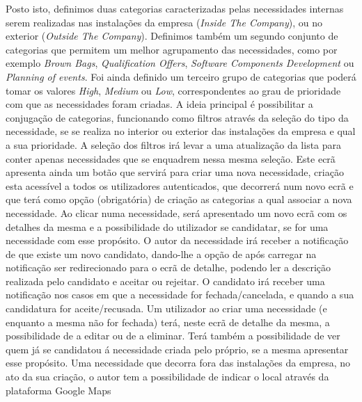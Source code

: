Posto isto, definimos duas categorias caracterizadas pelas necessidades internas serem realizadas nas instalações da empresa (\textit{Inside The Company}), 
ou no exterior (\textit{Outside The Company}). 
Definimos também um segundo conjunto de categorias que permitem um melhor agrupamento das necessidades, como por exemplo \textit{Brown Bags}, 
\textit{Qualification Offers}, \textit{Software Components Development} ou \textit{Planning of events}. 
Foi ainda definido um terceiro grupo de categorias que poderá tomar os valores \textit{High}, \textit{Medium} ou \textit{Low}, 
correspondentes ao grau de prioridade com que as necessidades foram criadas. 
A ideia principal é possibilitar a conjugação de categorias, funcionando como filtros através da seleção do tipo da necessidade, 
se se realiza no interior ou exterior das instalações da empresa e qual a sua prioridade. 
A seleção dos filtros irá levar a uma atualização da lista para conter apenas necessidades que se enquadrem nessa mesma seleção. 
Este ecrã apresenta ainda um botão que servirá para criar uma nova necessidade, criação esta acessível a todos os utilizadores autenticados, 
que decorrerá num novo ecrã e que terá como opção (obrigatória) de criação as categorias a qual associar a nova necessidade. 
Ao clicar numa necessidade, será apresentado um novo ecrã com os detalhes da mesma e a possibilidade do utilizador se candidatar, 
se for uma necessidade com esse propósito. O autor da necessidade irá receber a notificação de que existe um novo candidato, 
dando-lhe a opção de após carregar na notificação ser redirecionado para o ecrã de detalhe, podendo ler a descrição realizada pelo candidato e aceitar ou rejeitar. 
O candidato irá receber uma notificação nos casos em que a necessidade for fechada/cancelada, e quando a sua candidatura for aceite/recusada. 
Um utilizador ao criar uma necessidade (e enquanto a mesma não for fechada) terá, neste ecrã de detalhe da mesma, a possibilidade de a editar ou de a eliminar. 
Terá também a possibilidade de ver quem já se candidatou á necessidade criada pelo próprio, se a mesma apresentar esse propósito. 
Uma necessidade que decorra fora das instalações da empresa, no ato da sua criação, o autor tem a possibilidade de indicar o local através da plataforma Google Maps

